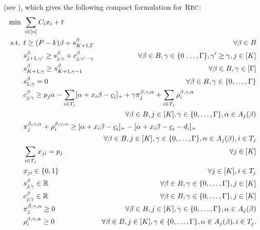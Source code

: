 \documentclass[a4paper,11pt,abstracton]{scrartcl}
\theoremstyle{definition}
\theoremstyle{remark}
\newcommand{\rr}{\mathbb{R}}
\begin{document}
(see \cite{korte2006combinatorial}),
which gives the following compact formulation for $\textsc{Rec}$:
\begin{subequations}\allowdisplaybreaks
\label{eq:com}  
\begin{align}
\min\ & \sum_{i\in[n]} C_i x_i + t \label{com-1} \\
\text{s.t. } & t \ge (P-k)\beta + s^\beta_{K+1,\Gamma} & \forall \beta \in B \label{com-2}\\
% 
& s^\beta_{j+1,\gamma'} \ge s^\beta_{j,\gamma} + c^\beta_{j,\gamma'-\gamma} & \forall \beta \in B, \gamma\in \{0\,\ldots,\Gamma\}, \gamma'\ge \gamma, j \in [K] \label{com-3}\\
% 
& s^\beta_{K+1,\gamma} \ge s^\beta_{K+1,\gamma-1} & \forall \beta\in B, \gamma\in[\Gamma] \label{com-4}\\
% 
& s^\beta_{1,\gamma} =0 & \forall \beta\in B, \gamma\in \{0,\ldots,\Gamma\} \label{com-5}\\
% 
& c^\beta_{j,\gamma} \ge  p_j \alpha - \sum_{i\in T_j} [\alpha + x_i\beta - \underline{c}_i]_+ + \gamma \pi^{\beta,\gamma,\alpha}_j + \sum_{i\in T_j} \rho^{\beta,\gamma,\alpha}_i \hspace{-5cm} \nonumber\\
& & \forall \beta \in B, j \in [K], \gamma \in \{0,\ldots,\Gamma\}, \alpha \in A_j(\beta) \label{com-6} \\
% 
& \pi^{\beta,\gamma,\alpha}_j + \rho^{\beta,\gamma,\alpha}_i \ge [\alpha + x_i\beta - \underline{c}_i]_+ - [\alpha + x_i \beta - \underline{c}_i - d_i]_+ \hspace{-5cm} \nonumber\\
& & \forall \beta\in B, j\in [K], \gamma\in \{0,\ldots,\Gamma\}, \alpha \in A_j(\beta), i\in T_j \label{com-7}\\
% 
& \sum_{i\in T_j} x_{ji} = p_j & \forall j\in [K] \label{com-8}\\
% 
& x_{ji} \in\{0,1\} & \forall j\in[K], i\in T_j \label{com-9}\\
% 
& s^\beta_{j,\gamma} \in \rr & \forall \beta \in B, \gamma\in\{0,\ldots,\Gamma\},j\in[K] \\
& c^\beta_{j,\gamma} \in \rr & \forall \beta \in B, \gamma\in\{0,\ldots,\Gamma\},j\in[K] \\
% 
& \pi^{\beta,\gamma,\alpha}_j \ge 0 & \forall \beta\in B, j\in[K], \gamma\in\{0,\ldots,\Gamma\}, \alpha\in A_j(\beta) \label{com-10} \\
% 
& \rho^{\beta,\gamma,\alpha}_i \ge 0 & \forall \beta\in B, j\in[K], \gamma\in\{0,\ldots,\Gamma\}, \alpha\in A_j(\beta), i\in T_j. \label{com-11}
\end{align}
\end{subequations}
\end{document}
